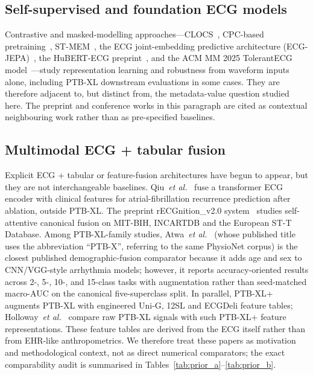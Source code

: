 \documentclass[mathematics,article,pdftex]{Definitions/mdpi}
\begin{document}
\subsection{Self-supervised and foundation ECG models}
Contrastive and masked-modelling approaches---CLOCS~\cite{Kiyasseh2021}, CPC-based pretraining~\cite{Mehari2022}, ST-MEM~\cite{Na2024}, the ECG joint-embedding predictive architecture (ECG-JEPA)~\cite{Weimann2025}, the HuBERT-ECG preprint~\cite{Coppola2024}, and the ACM MM 2025 TolerantECG model~\cite{Nguyen2025}---study representation learning and robustness from waveform inputs alone, including PTB-XL downstream evaluations in some cases. They are therefore adjacent to, but distinct from, the metadata-value question studied here. The preprint and conference works in this paragraph are cited as contextual neighbouring work rather than as pre-specified baselines.

\subsection{Multimodal ECG + tabular fusion}
Explicit ECG + tabular or feature-fusion architectures have begun to appear, but they are not interchangeable baselines. Qiu~\textit{et al.}~\cite{Qiu2024} fuse a transformer ECG encoder with clinical features for atrial-fibrillation recurrence prediction after ablation, outside PTB-XL. The preprint rECGnition\_v2.0 system~\cite{Srivastava2025} studies self-attentive canonical fusion on MIT-BIH, INCARTDB and the European ST-T Database. Among PTB-XL-family studies, Atwa~\textit{et al.}~\cite{Atwa2025} (whose published title uses the abbreviation ``PTB-X'', referring to the same PhysioNet corpus) is the closest published demographic-fusion comparator because it adds age and sex to CNN/VGG-style arrhythmia models; however, it reports accuracy-oriented results across 2-, 5-, 10-, and 15-class tasks with augmentation rather than seed-matched macro-AUC on the canonical five-superclass split. In parallel, PTB-XL+~\cite{Strodthoff2023PTBXLPlus} augments PTB-XL with engineered Uni-G, 12SL and ECGDeli feature tables; Holloway~\textit{et al.}~\cite{Holloway2026} compare raw PTB-XL signals with such PTB-XL+ feature representations. These feature tables are derived from the ECG itself rather than from EHR-like anthropometrics. We therefore treat these papers as motivation and methodological context, not as direct numerical comparators; the exact comparability audit is summarised in Tables~\ref{tab:prior_a}--\ref{tab:prior_b}.
\end{document}
